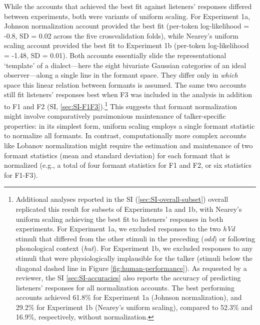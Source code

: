 \documentclass[preprint]{JASA}
\begin{document}
While the accounts that achieved the best fit against listeners' responses differed between experiments, both were variants of uniform scaling. For Experiment 1a, Johnson normalization account provided the best fit (per-token log-likelihood = -0.8, SD = 0.02 across the five crossvalidation folds), while Nearey's uniform scaling account provided the best fit to Experiment 1b (per-token log-likelihood = -1.48, SD = 0.01). Both accounts essentially slide the representational `template' of a dialect---here the eight bivariate Gaussian categories of an ideal observer---along a single line in the formant space. They differ only in \emph{which} space this linear relation between formants is assumed. The same two accounts still fit listeners' responses best when F3 was included in the analysis in addition to F1 and F2 (SI, \ref{sec:SI-F1F3}).\footnote{Additional analyses reported in the SI (\ref{sec:SI-overall-subset}) overall replicated this result for subsets of Experiments 1a and 1b, with Nearey's uniform scaling achieving the best fit to listeners' responses in both experiments. For Experiment 1a, we excluded responses to the two \emph{hVd} stimuli that differed from the other stimuli in the preceding (\emph{odd}) or following phonological context (\emph{hut}). For Experiment 1b, we excluded responses to any stimuli that were physiologically implausible for the talker (stimuli below the diagonal dashed line in Figure \ref{fig:human-performance}). As requested by a reviewer, the SI \ref{sec:SI-accuracies} also reports the accuracy of predicting listeners' responses for all normalization accounts. The best performing accounts achieved 61.8\% for Experiment 1a (Johnson normalization), and 29.2\% for Experiment 1b (Nearey's uniform scaling), compared to 52.3\% and 16.9\%, respectively, without normalization.} This suggests that formant normalization might involve comparatively parsimonious maintenance of talker-specific properties: in its simplest form, uniform scaling employs a single formant statistic to normalize all formants. In contrast, computationally more complex accounts like Lobanov normalization might require the estimation and maintenance of two formant statistics (mean and standard deviation) for each formant that is normalized (e.g., a total of four formant statistics for F1 and F2, or six statistics for F1-F3).
\end{document}

